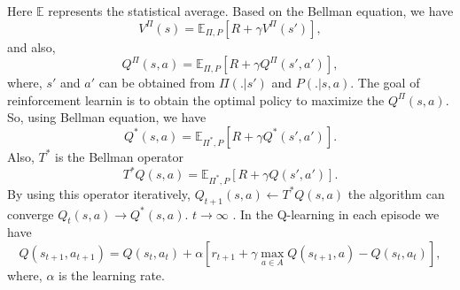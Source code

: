 \documentclass{article}
\begin{document}
 Here $\mathbb{E}$ represents the statistical average. 
 Based on the Bellman equation, we have
 \begin{equation}
	V^{\Pi}(s) = \mathbb{E}_{\Pi,P}[R+\gamma V^{\Pi}(s')],
\end{equation}  
 and also, 
   \begin{equation}
  	Q^{\Pi}(s,a) = \mathbb{E}_{\Pi,P}[R+\gamma Q^{\Pi}(s',a')],
  \end{equation}  
  where, $s'$ and $a'$ can be obtained from $\Pi(.|s')$ and $P(.|s,a)$.
The goal of reinforcement learnin is to obtain the optimal policy to maximize the $Q^{\Pi}(s,a)$.
So, using Bellman equation, we have
\begin{equation}
	Q^{*}(s,a) = \mathbb{E}_{\Pi^*,P}[R+\gamma Q^{*}(s',a')].
\end{equation} 
Also, $T^*$ is the Bellman operator
\begin{equation}
	T^{*}Q(s,a) = \mathbb{E}_{\Pi^*,P}[R+\gamma Q(s',a')].
\end{equation} 
By using this operator iteratively, 
$Q_{t+1}(s,a) \leftarrow T^{*}Q(s,a) $
the algorithm can converge
$Q_{t}(s,a) \rightarrow Q^*(s,a)$.
 $t \rightarrow \infty $
\cite{montague1999reinforcement,gan1}.
In the Q-learning in each episode we have
\begin{equation}
	Q(s_{t+1},a_{t+1}) = Q(s_t,a_t)+\alpha[ r_{t+1} + \gamma \max_{a \in A}{Q(s_{t+1},a)}-Q(s_t,a_t)],
\end{equation}
where, $\alpha$ is the learning rate.
\end{document}
